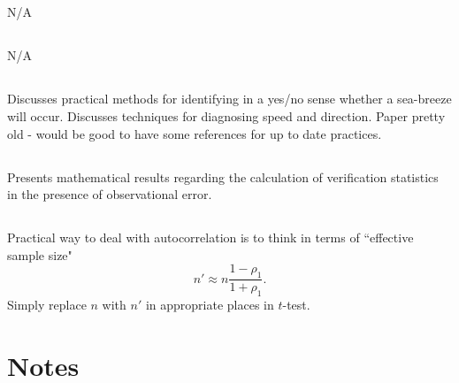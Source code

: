 \documentclass{article}
\begin{document}
\subsection{\citet{ebert00}}
N/A

\subsection{\citet{yates06}}
N/A

\subsection{\citet{mason08}}
Discusses practical methods for identifying in a yes/no sense whether a sea-breeze will occur. Discusses techniques for diagnosing speed and direction. Paper pretty old - would be good to have some references for up to date practices.  

\subsection{\citet{ferro17}}
Presents mathematical results regarding the calculation of verification statistics in the presence of observational error. 

\subsection{\citet{wilks11}}
Practical way to deal with autocorrelation is to think in terms of ``effective sample size" 
\begin{equation}
n' \approx n \frac{1-\rho_1}{1+\rho_1}.
\end{equation} 
Simply replace $n$ with $n'$ in appropriate places in $t$-test. 

\section{Notes}
\end{document}
